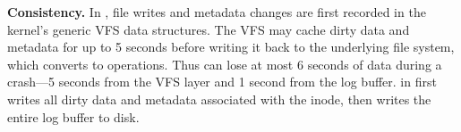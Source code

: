 \vspace{5pt}
\noindent \textbf{Consistency.}
In \betrfs,
file writes and metadata changes are first recorded in the kernel's generic VFS data structures.
The VFS may cache dirty data and metadata for up to 5 seconds before writing
it back to the underlying file system,
which \betrfs converts to \bet operations.
Thus \betrfs can lose at most 6
seconds of data during a crash---5 seconds from the VFS layer and 1 second from the \bet log buffer.
\fsync in \betrfs first writes all dirty data and metadata associated with the inode,
then writes the entire log buffer to disk.


